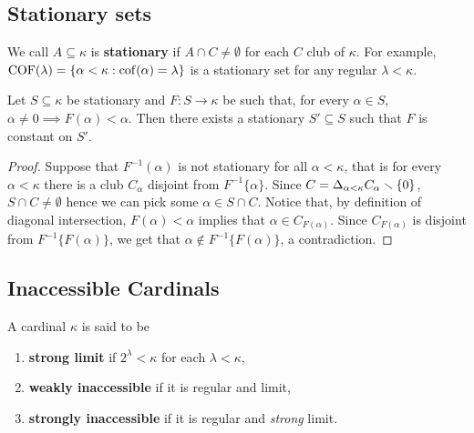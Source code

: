 \documentclass[twoside,openright,titlepage,numbers=noenddot,%
               headinclude,footinclude,cleardoublepage=empty,abstract=on,
               BCOR=23mm,paper=letter,fontsize=11pt
               ]{scrreprt}
\begin{document}
\subsection{Stationary sets}
We call $A \subseteq \kappa$ is \textbf{stationary} if $A \cap C \neq \emptyset$ for each $C$ club of $\kappa$.
For example, $\mathrm{COF}(\lambda) = \{\alpha < \kappa: \mathrm{cof}(\alpha) = \lambda\}$ is a stationary set for any regular $\lambda < \kappa$.
\begin{theorem}
    Let $S \subseteq \kappa$ be stationary and $F: S \to \kappa$ be such that, for every $\alpha \in S$, $\alpha \neq 0 \implies F(\alpha) < \alpha$. Then there exists a stationary $S' \subseteq S$ such that $F$ is constant on $S'$.
\end{theorem}
\begin{proof}
    Suppose that $F^{-1}(\alpha)$ is not stationary for all $\alpha < \kappa$, that is for every $\alpha < \kappa$ there is a club $C_\alpha$ disjoint from $F^{-1}\{\alpha\}$. Since $C = \Delta_{\alpha < \kappa} C_\alpha \smallsetminus \{0\}$, $S \cap C \neq \emptyset$ hence we can pick some $\alpha \in S\cap C$. Notice that, by definition of diagonal intersection, $F(\alpha) < \alpha$ implies that $\alpha \in C_{F(\alpha)}$. Since $C_{F(\alpha)}$ is disjoint from $F^{-1}\{F(\alpha)\}$, we get that $\alpha \notin F^{-1}\{F(\alpha)\}$, a contradiction.
\end{proof}
\subsection{Inaccessible Cardinals}
\begin{definition}
    A cardinal $\kappa$ is said to be
    \begin{enumerate}
        \item \textbf{strong limit} if $2^\lambda < \kappa$ for each $\lambda < \kappa$,
        \item \textbf{weakly inaccessible} if it is regular and limit,
        \item \textbf{strongly inaccessible} if it is regular and \textit{strong} limit.
    \end{enumerate}
\end{definition}
\end{document}

